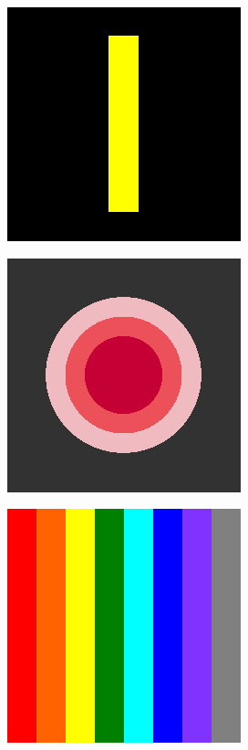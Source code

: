 \begin{figure}[H]
    \centering
    \begin{subfigure}{\ResultSubFigureWidth \linewidth}
        \centering
        \includegraphics[width=\ResultSubFigurePadding \linewidth]{image/image_inpaint_synthetic/case01-original.png}
    \end{subfigure}
    \begin{subfigure}{\ResultSubFigureWidth \linewidth}
        \centering
        \includegraphics[width=\ResultSubFigurePadding \linewidth]{image/image_inpaint_synthetic/case02-original.png}
    \end{subfigure}
    \begin{subfigure}{\ResultSubFigureWidth \linewidth}
        \centering
        \includegraphics[width=\ResultSubFigurePadding \linewidth]{image/image_inpaint_synthetic/case03-original.png}			

\end{subfigure}
\end{figure}
